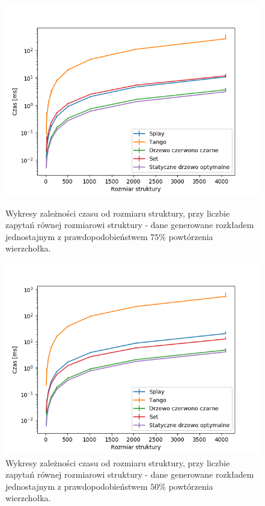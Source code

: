 \documentclass[declaration,shortabstract]{iithesis}
\theoremstyle{thm}
\theoremstyle{remark}
\theoremstyle{plain}
\theoremstyle{plain}
\theoremstyle{plain}
\begin{document}
\begin{figure}[ht]
\begin{minipage}[b]{.45\textwidth}
\centering
\includegraphics[width=1\textwidth]{wykresy/uniform25_main.png}
\caption{Wykresy zależności czasu od rozmiaru struktury, przy liczbie zapytań równej rozmiarowi struktury - dane generowane rozkładem jednostajnym z prawdopodobieństwem  \(75\%\) powtórzenia wierzchołka.}
\end{minipage}
\hfill
\begin{minipage}[b]{.45\textwidth}
\centering
\includegraphics[width=1\textwidth]{wykresy/uniform50_main.png}
\caption{Wykresy zależności czasu od rozmiaru struktury, przy liczbie zapytań równej rozmiarowi struktury - dane generowane rozkładem jednostajnym z prawdopodobieństwem  \(50\%\) powtórzenia wierzchołka.}
\end{minipage}
\end{figure}
\end{document}

